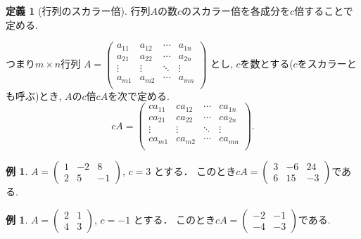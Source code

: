 \documentclass[dvipdfmx,a4paper,11pt]{article}
\theoremstyle{definition}
\newtheorem{dfn}[thm]{定義}
\newtheorem{exa}[thm]{例}
\begin{document}
 
  \begin{tcolorbox}[
    colback = white,
    colframe = green!35!black,
    fonttitle = \bfseries,
    breakable = true]
    \begin{dfn}[行列のスカラー倍]
    \text{}
    行列$A$の数$c$のスカラー倍を各成分を$c$倍することで定める. 
    
    つまり$m \times n$行列
 $
A=\begin{pmatrix}
a_{11}& a_{12} & \cdots &a_{1n} \\
a_{21}& a_{22} & \cdots &a_{2n} \\
\vdots& \vdots	&	\ddots   &	\vdots \\
a_{m1}& a_{m2} & \cdots &a_{mn} \\
\end{pmatrix}$
とし, $c$を数とする($c$をスカラーとも呼ぶ)とき, 
$A$の$c$倍$cA$を次で定める.
$$
cA=
\begin{pmatrix}
ca_{11}&c a_{12} & \cdots &ca_{1n} \\
ca_{21}& ca_{22} & \cdots &ca_{2n} \\
\vdots& \vdots	&	\ddots   &	\vdots \\
ca_{m1}& ca_{m2} & \cdots &ca_{mn} \\
\end{pmatrix}.
$$
  \end{dfn}
 \end{tcolorbox}

\begin{exa}
 $A = 
 \begin{pmatrix}
 1 &-2&8 \\
 2&5&-1
 \end{pmatrix}
 $,
 $
 c =3
 $
 とする．
 このとき$
 cA =
 \begin{pmatrix}
 3 &-6&24 \\
 6&15&-3
 \end{pmatrix}
 $である.
 \end{exa}
 \begin{exa}
 $A = 
 \begin{pmatrix}
 2&1 \\
 4&3
 \end{pmatrix}
 $, 
 $
 c =-1
 $
 とする．
 このとき$
 cA =
 \begin{pmatrix}
 -2 &-1 \\
-4&-3
 \end{pmatrix}
 $である.
 \end{exa}
 
\end{document}
